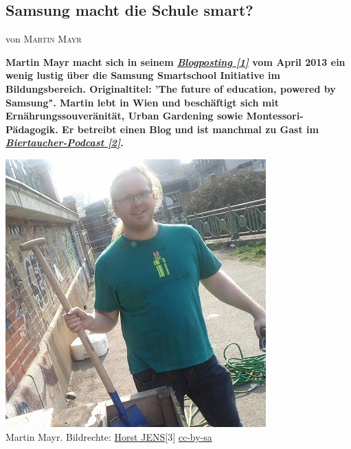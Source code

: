 \documentclass[10pt,a4paper,ngerman,twoside]{article} %
\newcommand{\NewsItem}[1]{ %
\usefont{T1}{fvs}{n}{n} %
\vspace{24pt}\large #1\vspace{3pt} %
\par \normalsize \normalfont}
\newcommand{\NewsAuthor}[1]{ %
\hfill von \textsc{#1} \vspace{20pt} %
\par \normalfont}
\begin{document}
\begin{multicols}{3}  
\NewsItem{}
\section*{Samsung macht die Schule smart?}
\label{smartschool}
\NewsAuthor{Martin Mayr}

\textbf{Martin Mayr macht sich in seinem \href{http://martinslangweiligesblog.wordpress.com/2013/04/01/the-future-of-education-powered-by-samsung/}{\textit{Blogposting [1]}} vom April 2013 ein wenig lustig über die Samsung Smartschool Initiative im Bildungsbereich. Originaltitel: 'The future of education, powered by Samsung". Martin lebt in Wien und beschäftigt sich mit Ernährungssouveränität, Urban Gardening sowie Montessori-Pädagogik. Er betreibt einen Blog und ist manchmal zu Gast im \href{http://biertaucher.at}{\textit{Biertaucher-Podcast [2]}}.}

\begin{center}
\includegraphics[width=\linewidth]{smartschool/martinderm2.jpg} \\
\footnotesize{Martin Mayr. Bildrechte: \href{http://spielend-programmieren.at}{Horst JENS}[3] \href{http://creativecommons.org/licenses/by-sa/3.0/}{cc-by-sa}}
\end{center}


\end{multicols}
\end{document}
